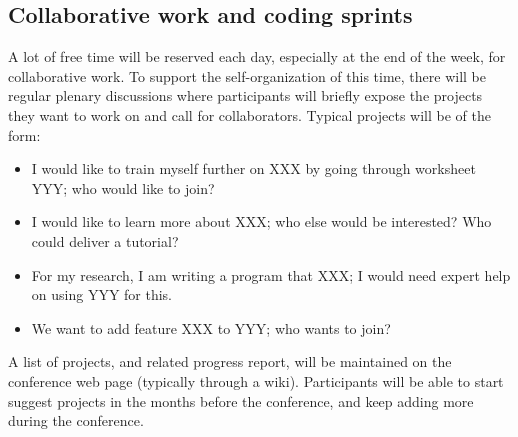 \documentclass[12pt]{amsart}
\begin{document}
\subsection{Collaborative work and coding sprints}

A lot of free time will be reserved each day, especially at the end of
the week, for collaborative work. To support the self-organization of
this time, there will be regular plenary discussions where
participants will briefly expose the projects they want to work on and
call for collaborators. Typical projects will be of the form:
\begin{itemize}
\item I would like to train myself further on XXX by going through
  worksheet YYY; who would like to join?
\item I would like to learn more about XXX; who else would be
  interested? Who could deliver a tutorial?
\item For my research, I am writing a program that XXX; I would need
  expert help on using YYY for this.
\item We want to add feature XXX to YYY; who wants to join?
\end{itemize}

A list of projects, and related progress report, will be maintained on
the conference web page (typically through a wiki). Participants will
be able to start suggest projects in the months before the conference,
and keep adding more during the conference.
\end{document}
